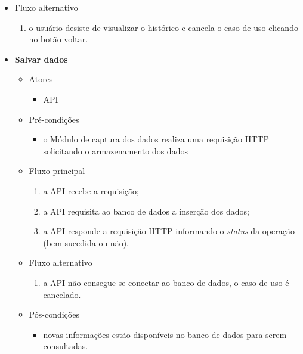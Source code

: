 \begin{itemize}
\begin{itemize}
		    \item Fluxo alternativo
			    \begin{enumerate}
			        \item o usuário desiste de visualizar o histórico e cancela o caso de uso clicando no botão voltar.
			    \end{enumerate}
		\end{itemize}
\end{itemize}

\newpage

\begin{itemize}


	\item \textbf{Salvar dados}

		\begin{itemize}
		    \item Atores
			    \begin{itemize}
			        \item API
			    \end{itemize}

		    \item Pré-condições
			    \begin{itemize}
			        \item o Módulo de captura dos dados realiza uma requisição HTTP solicitando o armazenamento dos dados
			    \end{itemize}

		    \item Fluxo principal
			    \begin{enumerate}
			        \item a API recebe a requisição;
			        \item a API requisita ao banco de dados a inserção dos dados;
        			\item a API responde a requisição HTTP informando o \textit{status} da operação (bem sucedida ou não).
			    \end{enumerate}
    
		    \item Fluxo alternativo
			    \begin{enumerate}
			        \item a API não consegue se conectar ao banco de dados, o caso de uso é cancelado.
			    \end{enumerate}
	
		    \item Pós-condições
			    \begin{itemize}
			       \item novas informações estão disponíveis no banco de dados para serem consultadas.
			    \end{itemize}
		\end{itemize}
		

\end{itemize}
